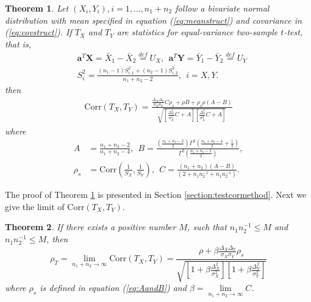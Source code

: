 \documentclass[12pt, a4paper]{article}
\newtheorem{theorem}{Theorem}       %
\newcommand{\cor}{\text{Corr}}
\begin{document}
	
	\begin{theorem}\label{thm:tstat}
		Let $(X_i, Y_i), i = 1, \ldots, n_1 + n_2$ follow a bivariate normal distribution with mean specified in equation (\ref{eq:meanstruct}) and covariance in (\ref{eq:covstruct}). If $T_X$ and $T_Y$ are statistics for equal-variance two-sample $t$-test, that is, 
		\begin{equation}\label{eq:tstatform}
			\begin{aligned}
				&\bm a^T\bm X  = \bar{X}_1 - \bar{X}_2 \stackrel{def}{= }U_X, ~~\bm a^T\bm Y = \bar{Y}_1 -\bar{Y}_2 \stackrel{def}{=}U_Y \\
				&S_i^2 = \frac{(n_1-1)S_{i, 1}^2 + (n_2 -1)S_{i,2}^2}{n_1 + n_2 -2}, ~~i = X, Y.
			\end{aligned}
		\end{equation}
		then 
		\begin{equation}\label{eq:ttestcor}
	\begin{aligned}
	 \cor(T_X, T_Y) =   
	 \frac{\frac{\Delta_X\Delta_Y}{\sigma_X\sigma_Y}C \rho_{s}+ \rho B
		+ \rho_{s}\rho(A-B)}{\sqrt{\left[ \frac{\Delta_X^2}{\sigma_X^2}C + A\right]\left[\frac{\Delta_Y^2}{\sigma_X^2}C +   A\right]}}
	\end{aligned}
		\end{equation}
	where 
			 \begin{equation}\label{eq:AandB}
			 	 \begin{aligned}
			 	 A & = \frac{n_1 + n_2-2}{n_1 + n_2-4}, ~~B =
			 	 \frac{(\frac{n_1 + n_2 -2}{2})\Gamma^2(\frac{n_1 + n_2 -4}{2} + \frac{1}{2})}{\Gamma^2(\frac{n_1+ n_2 -2}{2})}, \\
			 	 \rho_s & = \cor(\frac{1}{S_X}, \frac{1}{S_Y}), ~~ 
			 	 C = \frac{(n_1 + n_2)(A-B)}{(2 + n_1n_2^{-1} + n_1n_2^{-1})}.
			 	 \end{aligned}
			 \end{equation}	 
	\end{theorem}
	The proof of Theorem \ref{thm:tstat} is presented in Section \ref{section:testcormethod}. Next we give the limit of $\cor(T_X, T_Y)$.
	\begin{theorem}\label{thm:rholimit}
	  	If there exists a positive number $M$, such that  $n_1n_2^{-1}\leq M$ and $n_1n_2^{-1}\leq M$, then
	   \begin{equation}\label{limitT}
	   \rho_T=\lim\limits_{n_1 + n_2 \rightarrow \infty} \cor(T_X, T_Y) = \frac{\rho +
	   	\beta\frac{\Delta_X\Delta_Y}{\sigma_X\sigma_Y}\rho_{s}}{\sqrt{  \left[ 1 +\beta\frac{\Delta_X^2}{\sigma_X^2}\right]\left[ 1 + \beta\frac{\Delta_Y^2}{\sigma_Y^2}\right]}}
	   \end{equation}
	   where $\rho_{s}$ is defined in equation (\ref{eq:AandB}) and $\beta = \lim\limits_{n_1 + n_2 \rightarrow \infty}C$.
	\end{theorem}
\end{document}
